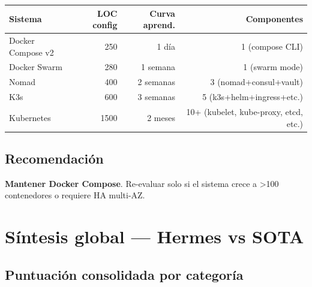 \documentclass[11pt,a4paper]{article}
\begin{document}
\begin{center}
\begin{tabular}{|l|r|r|r|}
\hline
\rowcolor{sotared}\color{white}\textbf{Sistema} & \color{white}\textbf{LOC config} & \color{white}\textbf{Curva aprend.} & \color{white}\textbf{Componentes}\\
\hline
Docker Compose v2 & ~250 & 1 día & 1 (compose CLI)\\
Docker Swarm & ~280 & 1 semana & 1 (swarm mode)\\
Nomad & ~400 & 2 semanas & 3 (nomad+consul+vault)\\
K3s & ~600 & 3 semanas & 5 (k3s+helm+ingress+etc.)\\
Kubernetes & ~1500 & 2 meses & 10+ (kubelet, kube-proxy, etcd, etc.)\\
\hline
\end{tabular}
\end{center}

\subsection{Recomendación}

\textbf{Mantener Docker Compose}. Re-evaluar solo si el sistema crece a \textgreater 100 contenedores o requiere HA multi-AZ.

\newpage

\section{Síntesis global — Hermes vs SOTA}

\subsection{Puntuación consolidada por categoría}
\end{document}
